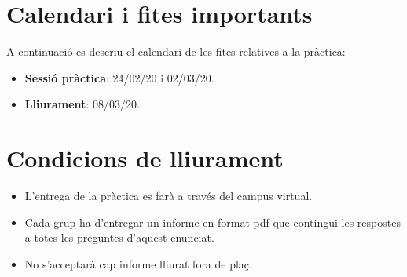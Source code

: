 \documentclass[12pt,a4paper]{article}
\begin{document}
\section{Calendari i fites importants}

A continuació es descriu el calendari de les fites relatives a la pràctica:

\begin{itemize}
        \item \textbf{Sessió pràctica}: 24/02/20 i 02/03/20.
	\item \textbf{Lliurament}: 08/03/20.
\end{itemize}

\section{Condicions de lliurament}

\begin{itemize}
  \item L'entrega de la pràctica es farà a través del campus virtual.
  \item Cada grup ha d'entregar un informe en format pdf que contingui les respostes a totes les preguntes d'aquest enunciat.
   \item No s'acceptarà cap informe lliurat fora de plaç.
\end{itemize}



\end{document}
